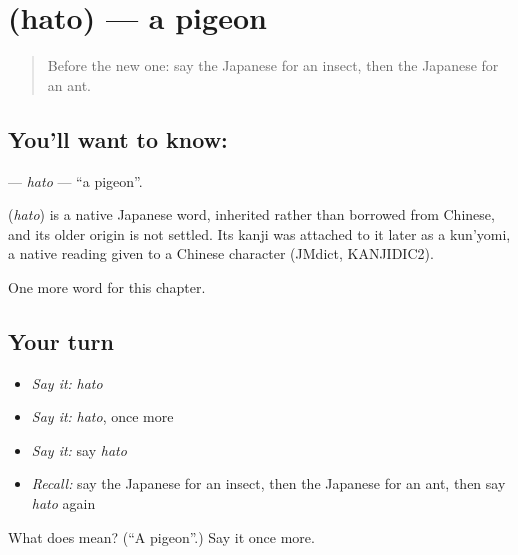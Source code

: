 \section[\texorpdfstring{\ja{はと} (hato)}{はと (hato)}]{ (hato) — a pigeon}

\label{lesson:JA-C46-hato}



\begin{quote}
Before the new one: say the Japanese for an insect, then the Japanese for an ant.
\end{quote}

\subsection*{You'll want to know: }
\textbf{} — \emph{hato} — \textquotedblleft{}a pigeon\textquotedblright{}.

\begin{cousinweb}
\textbf{} (\emph{hato}) is a native Japanese word, inherited rather than borrowed from Chinese, and its older origin is not settled. Its kanji was attached to it later as a kun'yomi, a native reading given to a Chinese character (JMdict, KANJIDIC2).
\end{cousinweb}

\begin{grammarlens}[title={What you've built}]
One more word for this chapter.
\end{grammarlens}

\subsection*{Your turn}
\begin{itemize}
\raggedright
  \item \emph{Say it:} \emph{hato}
  \item \emph{Say it:} \emph{hato}, once more
  \item \emph{Say it:} say \emph{hato}
  \item \emph{Recall:} say the Japanese for an insect, then the Japanese for an ant, then say \emph{hato} again
\end{itemize}

\begin{tcolorbox}[breakable,colback=teal!4,colframe=teal!35!black,title={Before you move on}]
What does  mean? (\textquotedblleft{}A pigeon\textquotedblright{}.) Say it once more.
\end{tcolorbox}
